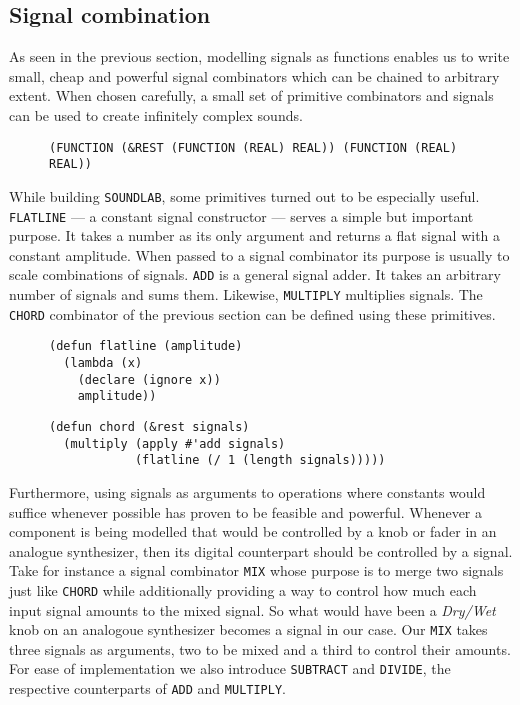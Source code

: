 \subsection{Signal combination}

As seen in the previous section, modelling signals as functions
enables us to write small, cheap and powerful signal combinators which
can be chained to arbitrary extent. When chosen carefully, a small set of
primitive combinators and signals can be used to create infinitely
complex sounds.

\begin{figure}
\centering
\begin{verbatim}
(FUNCTION (&REST (FUNCTION (REAL) REAL)) (FUNCTION (REAL) REAL))
\end{verbatim}
\end{figure}

While building \texttt{SOUNDLAB}, some primitives turned out to be
especially useful. \texttt{FLATLINE} --- a constant signal constructor
--- serves a simple but important purpose. It takes a number as its only
argument and returns a flat signal with a constant amplitude. When passed
to a signal combinator its purpose is usually to scale combinations of
signals. \texttt{ADD} is a general signal adder. It takes an arbitrary
number of signals and sums them. Likewise, \texttt{MULTIPLY} multiplies
signals. The \texttt{CHORD} combinator of the previous section can be
defined using these primitives.

\begin{figure}
\centering
\begin{verbatim}
(defun flatline (amplitude)
  (lambda (x)
    (declare (ignore x))
    amplitude))
\end{verbatim}
\end{figure}

\begin{figure}
\centering
\begin{verbatim}
(defun chord (&rest signals)
  (multiply (apply #'add signals)
            (flatline (/ 1 (length signals)))))
\end{verbatim}
\end{figure}

Furthermore, using signals as arguments to operations where constants
would suffice whenever possible has proven to be feasible and powerful.
Whenever a component is being modelled that would be controlled by a knob
or fader in an analogue synthesizer, then its digital counterpart should
be controlled by a signal. Take for instance a signal combinator
\texttt{MIX} whose purpose is to merge two signals just like
\texttt{CHORD} while additionally providing a way to control how much
each input signal amounts to the mixed signal. So what would have been a
\textit{Dry/Wet} knob on an analogoue synthesizer becomes a signal in our
case. Our \texttt{MIX} takes three signals as arguments, two to be mixed
and a third to control their amounts. For ease of implementation we also
introduce \texttt{SUBTRACT} and \texttt{DIVIDE}, the respective
counterparts of \texttt{ADD} and \texttt{MULTIPLY}.

